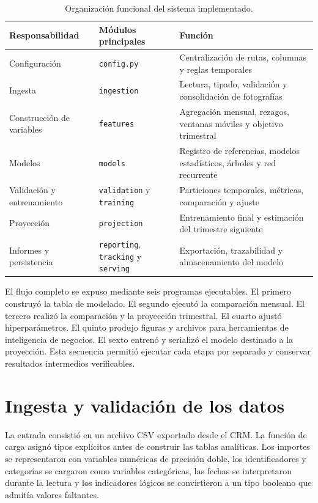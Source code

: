\begin{table}[ht]
    \centering
    \caption{Organización funcional del sistema implementado.}
    \label{tab:arquitecturaModulos}
    \small
    \begin{tabular}{p{3.2cm} p{3.4cm} p{5.1cm}}
        \toprule
        Responsabilidad & Módulos principales & Función \\
        \midrule
        Configuración & \texttt{config.py} & Centralización de rutas, columnas y reglas temporales \\
        Ingesta & \texttt{ingestion} & Lectura, tipado, validación y consolidación de fotografías \\
        Construcción de variables & \texttt{features} & Agregación mensual, rezagos, ventanas móviles y objetivo trimestral \\
        Modelos & \texttt{models} & Registro de referencias, modelos estadísticos, árboles y red recurrente \\
        Validación y entrenamiento & \texttt{validation} y \texttt{training} & Particiones temporales, métricas, comparación y ajuste \\
        Proyección & \texttt{projection} & Entrenamiento final y estimación del trimestre siguiente \\
        Informes y persistencia & \texttt{reporting}, \texttt{tracking} y \texttt{serving} & Exportación, trazabilidad y almacenamiento del modelo \\
        \bottomrule
    \end{tabular}
\end{table}

El flujo completo se expuso mediante seis programas ejecutables. El primero construyó la tabla de modelado. El segundo ejecutó la comparación mensual. El tercero realizó la comparación y la proyección trimestral. El cuarto ajustó hiperparámetros. El quinto produjo figuras y archivos para herramientas de inteligencia de negocios. El sexto entrenó y serializó el modelo destinado a la proyección. Esta secuencia permitió ejecutar cada etapa por separado y conservar resultados intermedios verificables.

\section{Ingesta y validación de los datos}
\label{sec:ingestaValidacion}

La entrada consistió en un archivo CSV exportado desde el CRM. La función de carga asignó tipos explícitos antes de construir las tablas analíticas. Los importes se representaron con variables numéricas de precisión doble, los identificadores y categorías se cargaron como variables categóricas, las fechas se interpretaron durante la lectura y los indicadores lógicos se convirtieron a un tipo booleano que admitía valores faltantes.

